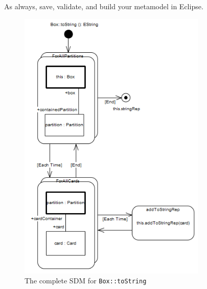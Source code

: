 \begin{stepbystep}
\item As always, save, validate, and build your metamodel in Eclipse.

\begin{figure}[htbp]
\begin{center}
  \includegraphics[width=0.8\textwidth]{../../org.moflon.doc.handbook.03_storyDiagrams/10_stringRep/visSRImages/ea_toStringComplete}
  \caption{The complete SDM for \texttt{Box::toString}}  
  \label{ea:sdm_tostringComplete}
\end{center}
\end{figure}
\FloatBarrier

\end{stepbystep}

